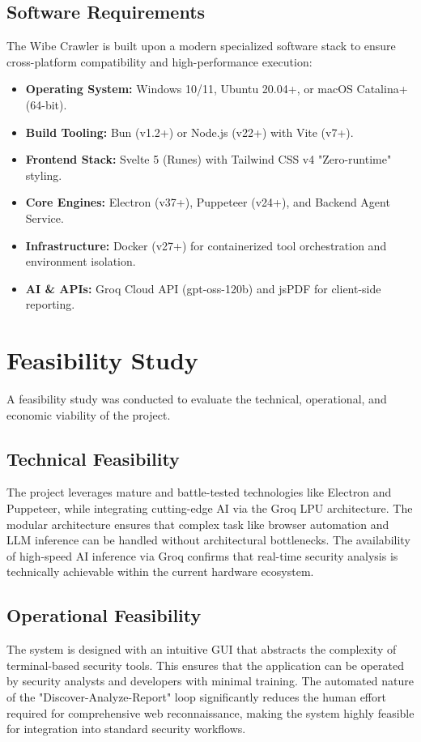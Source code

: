 \documentclass[12pt,oneside,a4paper]{book}
\begin{document}
\subsection{Software Requirements}
The Wibe Crawler is built upon a modern specialized software stack to ensure cross-platform compatibility and high-performance execution:
\begin{itemize}
    \item \textbf{Operating System:} Windows 10/11, Ubuntu 20.04+, or macOS Catalina+ (64-bit).
    \item \textbf{Build Tooling:} Bun (v1.2+) or Node.js (v22+) with Vite (v7+).
    \item \textbf{Frontend Stack:} Svelte 5 (Runes) with Tailwind CSS v4 "Zero-runtime" styling.
    \item \textbf{Core Engines:} Electron (v37+), Puppeteer (v24+), and Backend Agent Service.
    \item \textbf{Infrastructure:} Docker (v27+) for containerized tool orchestration and environment isolation.
    \item \textbf{AI \& APIs:} Groq Cloud API (gpt-oss-120b) and jsPDF for client-side reporting.
\end{itemize}

\section{Feasibility Study}
A feasibility study was conducted to evaluate the technical, operational, and economic viability of the project.

\subsection{Technical Feasibility}
The project leverages mature and battle-tested technologies like Electron and Puppeteer, while integrating cutting-edge AI via the Groq LPU architecture. The modular architecture ensures that complex task like browser automation and LLM inference can be handled without architectural bottlenecks. The availability of high-speed AI inference via Groq confirms that real-time security analysis is technically achievable within the current hardware ecosystem.

\subsection{Operational Feasibility}
The system is designed with an intuitive GUI that abstracts the complexity of terminal-based security tools. This ensures that the application can be operated by security analysts and developers with minimal training. The automated nature of the "Discover-Analyze-Report" loop significantly reduces the human effort required for comprehensive web reconnaissance, making the system highly feasible for integration into standard security workflows.
\end{document}
